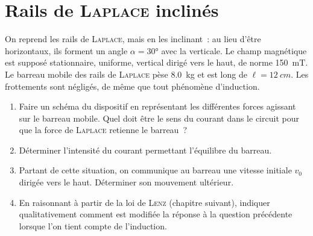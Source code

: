 \documentclass[a4paper, 10pt, final, garamond]{book}
\begin{document}
\section{Rails de \textsc{Laplace} inclinés}
\label{sec:railpl}
On reprend les rails de \textsc{Laplace}, mais en les inclinant~: au lieu d'être
horizontaux, ils forment un angle $\alpha = \ang{30;;}$ avec la verticale. Le
champ magnétique est supposé stationnaire, uniforme, vertical dirigé vers le
haut, de norme \SI{150}{mT}. Le barreau mobile des rails de \textsc{Laplace}
pèse \SI{8.0}{kg} et est long de $\ell = \SI{12}{cm}$. Les frottements sont
négligés, de même que tout phénomène d'induction.
\begin{enumerate}
  \item Faire un schéma du dispositif en représentant les différentes forces
    agissant sur le barreau mobile. Quel doit être le sens du courant dans le
    circuit pour que la force de \textsc{Laplace} retienne le barreau~?
  \item Déterminer l'intensité du courant permettant l'équilibre du barreau.
  \item Partant de cette situation, on communique au barreau une vitesse
    initiale $v_0$ dirigée vers le haut. Déterminer son mouvement ultérieur.
  \item En raisonnant à partir de la loi de \textsc{Lenz} (chapitre suivant),
    indiquer qualitativement comment est modifiée la réponse à la question
    précédente lorsque l'on tient compte de l'induction.
\end{enumerate}
\end{document}
